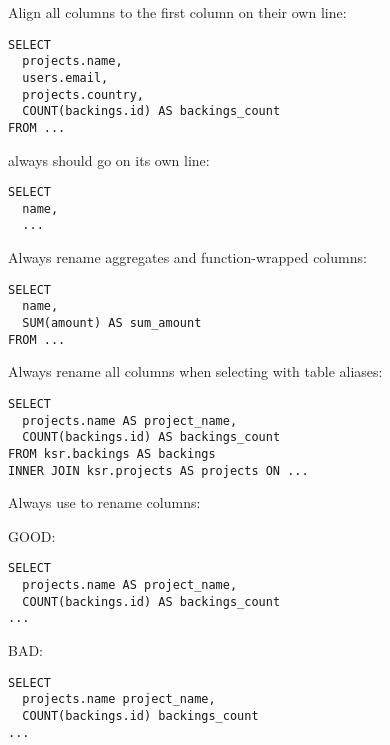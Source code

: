 Align all columns to the first column on their own line:

\begin{verbatim}
SELECT
  projects.name,
  users.email,
  projects.country,
  COUNT(backings.id) AS backings_count
FROM ...
\end{verbatim}


 always should go on its own line:

\begin{verbatim}
SELECT
  name,
  ...
\end{verbatim}

Always rename aggregates and function-wrapped columns:

\begin{verbatim}
SELECT
  name,
  SUM(amount) AS sum_amount
FROM ...
\end{verbatim}



Always rename all columns when selecting with table aliases:

\begin{verbatim}
SELECT
  projects.name AS project_name,
  COUNT(backings.id) AS backings_count
FROM ksr.backings AS backings
INNER JOIN ksr.projects AS projects ON ...
\end{verbatim}

Always use  to rename columns:

GOOD:

\begin{verbatim}
SELECT
  projects.name AS project_name,
  COUNT(backings.id) AS backings_count
...
\end{verbatim}

BAD:

\begin{verbatim}
SELECT
  projects.name project_name,
  COUNT(backings.id) backings_count
...
\end{verbatim}

\endinput
Long Window functions should be split across multiple lines: one for the `PARTITION`, `ORDER` and frame clauses, aligned to the `PARTITION` keyword. Partition keys should be one-per-line, aligned to the first, with aligned commas. Order (`ASC`, `DESC`) should always be explicit. All window functions should be aliased.

```sql
SUM(1) OVER (PARTITION BY category_id,
                          year
             ORDER BY pledged DESC
             ROWS UNBOUNDED PRECEDING) AS category_year
```

